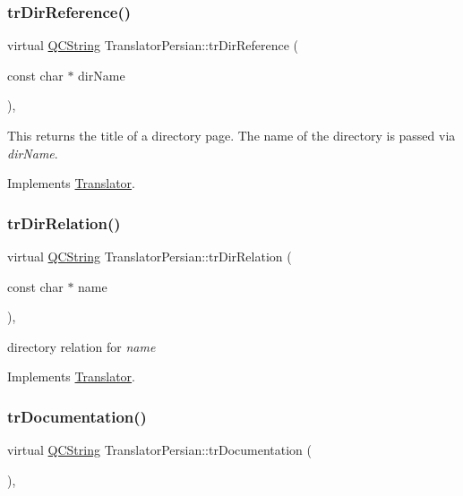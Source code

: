 \subsubsection{\texorpdfstring{trDirReference()}{trDirReference()}}
{\footnotesize\ttfamily virtual \mbox{\hyperlink{class_q_c_string}{Q\+C\+String}} Translator\+Persian\+::tr\+Dir\+Reference (\begin{DoxyParamCaption}\item[{const char $\ast$}]{dir\+Name }\end{DoxyParamCaption})\hspace{0.3cm}{\ttfamily [inline]}, {\ttfamily [virtual]}}

This returns the title of a directory page. The name of the directory is passed via {\itshape dir\+Name}. 

Implements \mbox{\hyperlink{class_translator}{Translator}}.

\mbox{\label{class_translator_persian_aee44dbc70588bd500a54a05834d8abf5}} 
\subsubsection{\texorpdfstring{trDirRelation()}{trDirRelation()}}
{\footnotesize\ttfamily virtual \mbox{\hyperlink{class_q_c_string}{Q\+C\+String}} Translator\+Persian\+::tr\+Dir\+Relation (\begin{DoxyParamCaption}\item[{const char $\ast$}]{name }\end{DoxyParamCaption})\hspace{0.3cm}{\ttfamily [inline]}, {\ttfamily [virtual]}}

directory relation for {\itshape name} 

Implements \mbox{\hyperlink{class_translator}{Translator}}.

\mbox{\label{class_translator_persian_a419e7d7cfc28884b44a1c9d22519f774}} 
\subsubsection{\texorpdfstring{trDocumentation()}{trDocumentation()}}
{\footnotesize\ttfamily virtual \mbox{\hyperlink{class_q_c_string}{Q\+C\+String}} Translator\+Persian\+::tr\+Documentation (\begin{DoxyParamCaption}{ }\end{DoxyParamCaption})\hspace{0.3cm}{\ttfamily [inline]}, {\ttfamily [virtual]}}


